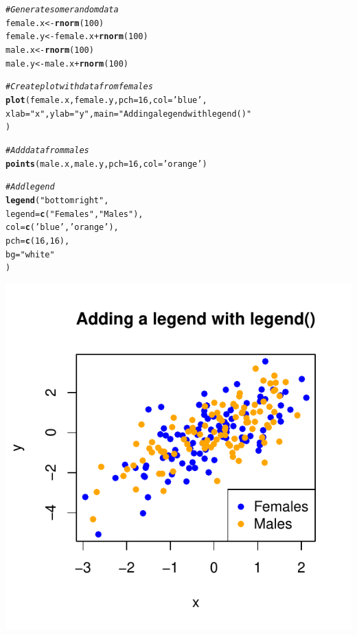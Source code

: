 \documentclass{tufte-book}\usepackage[]{graphicx}\usepackage[]{color}
\makeatletter
\def\maxwidth{ %
  \ifdim\Gin@nat@width>\linewidth
    \linewidth
  \else
    \Gin@nat@width
  \fi
}
\newcommand{\hlnum}[1]{\textcolor[rgb]{0.686,0.059,0.569}{#1}}%
\newcommand{\hlstr}[1]{\textcolor[rgb]{0.192,0.494,0.8}{#1}}%
\newcommand{\hlcom}[1]{\textcolor[rgb]{0.678,0.584,0.686}{\textit{#1}}}%
\newcommand{\hlopt}[1]{\textcolor[rgb]{0,0,0}{#1}}%
\newcommand{\hlstd}[1]{\textcolor[rgb]{0.345,0.345,0.345}{#1}}%
\newcommand{\hlkwb}[1]{\textcolor[rgb]{0.69,0.353,0.396}{#1}}%
\newcommand{\hlkwc}[1]{\textcolor[rgb]{0.333,0.667,0.333}{#1}}%
\newcommand{\hlkwd}[1]{\textcolor[rgb]{0.737,0.353,0.396}{\textbf{#1}}}%
\newenvironment{kframe}{%
 \def\at@end@of@kframe{}%
 \ifinner\ifhmode%
  \def\at@end@of@kframe{\end{minipage}}%
  \begin{minipage}{\columnwidth}%
 \fi\fi%
 \def\FrameCommand##1{\hskip\@totalleftmargin \hskip-\fboxsep
 \colorbox{shadecolor}{##1}\hskip-\fboxsep
     \hskip-\linewidth \hskip-\@totalleftmargin \hskip\columnwidth}%
 \MakeFramed {\advance\hsize-\width
   \@totalleftmargin\z@ \linewidth\hsize
   \@setminipage}}%
 {\par\unskip\endMakeFramed%
 \at@end@of@kframe}
\newenvironment{knitrout}{}{} %
\makeatother
\begin{document}
\begin{marginfigure}
\begin{tiny}
\begin{knitrout}
\color{fgcolor}\begin{kframe}
\begin{alltt}
\hlcom{# Generate some random data}
\hlstd{female.x} \hlkwb{<-} \hlkwd{rnorm}\hlstd{(}\hlnum{100}\hlstd{)}
\hlstd{female.y} \hlkwb{<-} \hlstd{female.x} \hlopt{+} \hlkwd{rnorm}\hlstd{(}\hlnum{100}\hlstd{)}
\hlstd{male.x} \hlkwb{<-} \hlkwd{rnorm}\hlstd{(}\hlnum{100}\hlstd{)}
\hlstd{male.y} \hlkwb{<-} \hlstd{male.x} \hlopt{+} \hlkwd{rnorm}\hlstd{(}\hlnum{100}\hlstd{)}

\hlcom{# Create plot with data from females}
\hlkwd{plot}\hlstd{(female.x, female.y,} \hlkwc{pch} \hlstd{=} \hlnum{16}\hlstd{,} \hlkwc{col} \hlstd{=} \hlstr{'blue'}\hlstd{,}
     \hlkwc{xlab} \hlstd{=} \hlstr{"x"}\hlstd{,} \hlkwc{ylab} \hlstd{=} \hlstr{"y"}\hlstd{,} \hlkwc{main} \hlstd{=} \hlstr{"Adding a legend with legend()"}
     \hlstd{)}

\hlcom{# Add data from males}
\hlkwd{points}\hlstd{(male.x, male.y,} \hlkwc{pch} \hlstd{=} \hlnum{16}\hlstd{,} \hlkwc{col} \hlstd{=} \hlstr{'orange'}\hlstd{)}

\hlcom{# Add legend}
\hlkwd{legend}\hlstd{(}\hlstr{"bottomright"}\hlstd{,}
       \hlkwc{legend} \hlstd{=} \hlkwd{c}\hlstd{(}\hlstr{"Females"}\hlstd{,} \hlstr{"Males"}\hlstd{),}
       \hlkwc{col} \hlstd{=} \hlkwd{c}\hlstd{(}\hlstr{'blue'}\hlstd{,} \hlstr{'orange'}\hlstd{),}
       \hlkwc{pch} \hlstd{=} \hlkwd{c}\hlstd{(}\hlnum{16}\hlstd{,} \hlnum{16}\hlstd{),}
       \hlkwc{bg} \hlstd{=} \hlstr{"white"}
       \hlstd{)}
\end{alltt}
\end{kframe}
\includegraphics[width=\maxwidth]{figure/unnamed-chunk-220-1} 


\end{knitrout}
\end{tiny}
\end{marginfigure}
\end{document}

